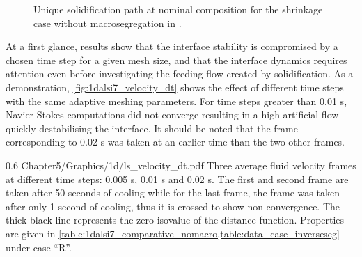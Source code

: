 \begin{figure}[htbp]
\centering
{}

\caption{Unique solidification path at nominal composition for the shrinkage case without macrosegregation in .}
\label{fig:shrinkage_nomacro_sp}
\end{figure}

At a first glance, results show that the interface stability is compromised by a chosen time step for a given mesh size, and that the interface dynamics
requires attention even before investigating the feeding flow created by solidification. As a demonstration, \cref{fig:1dalsi7_velocity_dt} shows the effect of different
time steps with the same adaptive meshing parameters. For time steps greater than 0.01 s, Navier-Stokes computations did not converge resulting in a high artificial 
flow quickly destabilising the interface. It should be noted that the frame corresponding to 0.02 s was taken at an earlier time than the two other frames.

\begin{figureth}
{0.6}
{Chapter5/Graphics/1d/ls_velocity_dt.pdf}
{Three average fluid velocity frames at different time steps: 0.005 s, 0.01 s and 0.02 s. The first and second frame are taken after 
50 seconds of cooling while for the last frame, the frame was taken after only 1 second of cooling, thus it is crossed to show non-convergence.
The thick black line represents the zero isovalue of the distance function. Properties are given in \cref{table:1dalsi7_comparative_nomacro,table:data_case_inverseseg}
under case ``R''.}
\label{fig:1dalsi7_velocity_dt}
\end{figureth}

